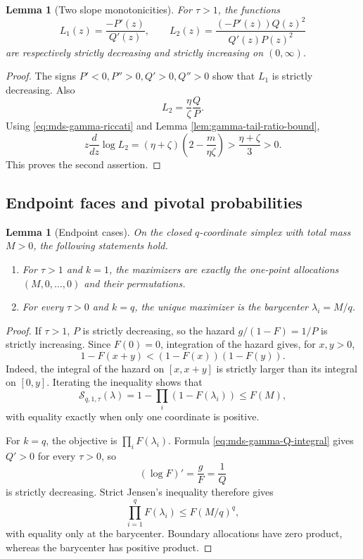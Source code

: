 \documentclass[11pt]{article}
\newtheorem{lemma}[theorem]{Lemma}
\theoremstyle{definition}
\theoremstyle{remark}
\newcommand{\1}{\mathbf 1}
\begin{document}
\begin{lemma}[Two slope monotonicities]
\label{lem:scaled-tail-auxiliary-monotonicity}
For \(\tau>1\), the functions
\[
  L_1(z)=\frac{-P'(z)}{Q'(z)},
  \qquad
  L_2(z)=\frac{(-P'(z))Q(z)^2}{Q'(z)P(z)^2}
\]
are respectively strictly decreasing and strictly increasing on \((0,\infty)\).
\end{lemma}

\begin{proof}
The signs \(P'<0,P''>0,Q'>0,Q''>0\) show that \(L_1\) is strictly decreasing.  Also
\[
  L_2=\frac{\eta}{\zeta}\frac QP.
\]
Using \eqref{eq:mds-gamma-riccati} and Lemma \ref{lem:gamma-tail-ratio-bound},
\[
  z\frac{d}{dz}\log L_2
  =(\eta+\zeta)\left(2-\frac m{\eta\zeta}\right)
  >\frac{\eta+\zeta}{3}>0.
\]
This proves the second assertion.
\end{proof}

\subsection{Endpoint faces and pivotal probabilities}

\begin{lemma}[Endpoint cases]
\label{lem:mds-endpoint-cases}
On the closed \(q\)-coordinate simplex with total mass \(M>0\), the following statements hold.
\begin{enumerate}
\item For \(\tau>1\) and \(k=1\), the maximizers are exactly the one-point allocations \((M,0,\ldots,0)\) and their permutations.
\item For every \(\tau>0\) and \(k=q\), the unique maximizer is the barycenter \(\lambda_i=M/q\).
\end{enumerate}
\end{lemma}

\begin{proof}
If \(\tau>1\), \(P\) is strictly decreasing, so the hazard \(g/(1-F)=1/P\) is strictly increasing.  Since \(F(0)=0\), integration of the hazard gives, for \(x,y>0\),
\[
  1-F(x+y)<(1-F(x))(1-F(y)).
\]
Indeed, the integral of the hazard on \([x,x+y]\) is strictly larger than its integral on \([0,y]\).  Iterating the inequality shows that
\[
  \mathcal S_{q,1,\tau}(\lambda)
  =1-\prod_i(1-F(\lambda_i))\le F(M),
\]
with equality exactly when only one coordinate is positive.

For \(k=q\), the objective is \(\prod_iF(\lambda_i)\).  Formula \eqref{eq:mds-gamma-Q-integral} gives \(Q'>0\) for every \(\tau>0\), so
\[
  (\log F)'=\frac gF=\frac1Q
\]
is strictly decreasing.  Strict Jensen's inequality therefore gives
\[
  \prod_{i=1}^qF(\lambda_i)\le F(M/q)^q,
\]
with equality only at the barycenter.  Boundary allocations have zero product, whereas the barycenter has positive product.
\end{proof}
\end{document}
